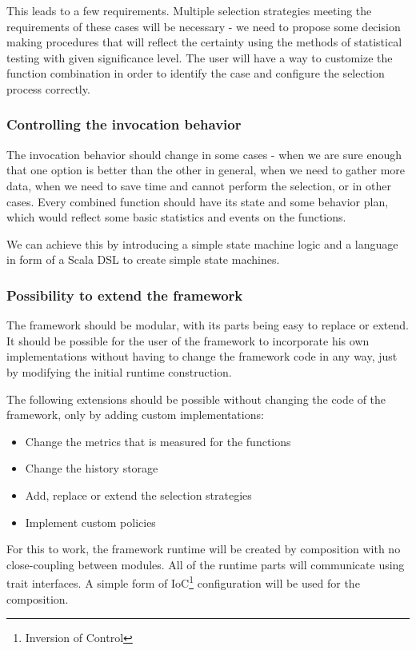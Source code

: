This leads to a few requirements. Multiple selection strategies meeting the requirements of these cases will be necessary - we need to propose some decision making procedures that will reflect the certainty using the methods of statistical testing with given significance level. The user will have a way to customize the function combination in order to identify the case and configure the selection process correctly.

\subsubsection{Controlling the invocation behavior}

The invocation behavior should change in some cases - when we are sure enough that one option is better than the other in general, when we need to gather more data, when we need to save time and cannot perform the selection, or in other cases. Every combined function should have its state and some behavior plan, which would reflect some basic statistics and events on the functions.

We can achieve this by introducing a simple state machine logic and a language in form of a Scala DSL to create simple state machines.

\subsubsection{Possibility to extend the framework}

The framework should be modular, with its parts being easy to replace or extend. It should be possible for the user of the framework to incorporate his own implementations without having to change the framework code in any way, just by modifying the initial runtime construction.

The following extensions should be possible without changing the code of the framework, only by adding custom implementations:

\begin{itemize}
	\item Change the metrics that is measured for the functions
	\item Change the history storage
	\item Add, replace or extend the selection strategies
	\item Implement custom policies
\end{itemize}

For this to work, the framework runtime will be created by composition with no close-coupling between modules. All of the runtime parts will communicate using trait interfaces. A simple form of IoC\footnote{Inversion of Control} configuration will be used for the composition.

